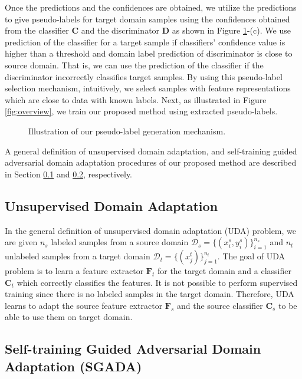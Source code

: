 \documentclass[final]{cvpr}
\begin{document}
Once the predictions and the confidences are obtained, we utilize the predictions to give pseudo-labels for target domain samples using the confidences obtained from the classifier $ \mathbf{C} $ and the discriminator $ \mathbf{D} $ as shown in Figure \ref{fig:adda}-(c). We use prediction of the classifier for a target sample if classifiers' confidence value is higher than a threshold and domain label prediction of discriminator is close to source domain. That is, we can use the prediction of the classifier if the discriminator incorrectly classifies target samples. By using this pseudo-label selection mechanism, intuitively, we select samples with feature representations which are close to data with known labels. Next, as illustrated in Figure \ref{fig:overview}, we train our proposed method using extracted pseudo-labels.

\begin{figure}[t]
\centering
    \vspace{2mm}
    \caption{Illustration of our pseudo-label generation mechanism.}
    \label{fig:adda}
\end{figure}

A general definition of unsupervised domain adaptation, and self-training guided adversarial domain adaptation procedures of our proposed method are described in Section \ref{sec:uda} and \ref{sec:selftraining}, respectively.

\subsection{Unsupervised Domain Adaptation}
\label{sec:uda}

In the general definition of unsupervised domain adaptation (UDA) problem, we are given $ n_s $ labeled samples from a source domain $ \mathcal{D}_s = \{(x^s_i, y^s_i)\}_{i=1}^{n_s} $ and $ n_t $ unlabeled samples from a target domain $ \mathcal{D}_t = \{(x^t_j)\}_{j=1}^{n_t} $. The goal of UDA problem is to learn a feature extractor $ \mathbf{F}_t $ for the target domain and a classifier $ \mathbf{C}_t $ which correctly classifies the features. It is not possible to perform supervised training since there is no labeled samples in the target domain. Therefore, UDA learns to adapt the source feature extractor $ \mathbf{F}_s $ and the source classifier $ \mathbf{C}_s $ to be able to use them on target domain.

\subsection{Self-training Guided Adversarial Domain Adaptation (SGADA)}
\label{sec:selftraining}
\end{document}
